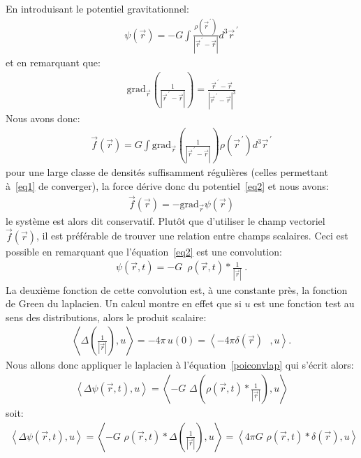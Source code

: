 En introduisant le potentiel gravitationnel:
\begin{align}
	\psi(\vec{r})=-G\displaystyle\int\frac{\rho(\vec{r}^{\,\prime})}{\left\vert \vec{r}^{\,\prime}-\vec{r}\right\vert }d^{3}\vec{r}%
	^{\,\prime}\label{eq2}%
\end{align}
et en remarquant que:
\begin{align*}
	\mathrm{grad}_{\vec{r}}\left(  \frac{1}{\left\vert \vec{r}^{\,\prime}-\vec{r}\right\vert }\right)  =\frac{\vec{r}^{\,\prime}-\vec{r}%
	}{\left\vert \vec{r}^{\,\prime}-\vec{r}\right\vert ^{3}}
\end{align*}
Nous avons donc:
\begin{align*}
	\vec{f}(\vec{r})=G\displaystyle\int\mathrm{grad}_{\vec{r}}\left(\frac{1}{\left\vert \vec{r}^{\,\prime}-\vec{r}\right\vert }\right)
	\rho(\vec{r}^{\,\prime})d^{3}\vec{r}^{\,\prime}
\end{align*}
pour une large classe de densités suffisamment régulières (celles permettant à~\ref{eq1} de converger), la force dérive donc du potentiel~\ref{eq2} et
nous avons:
\begin{align}
	\vec{f}(\vec{r})=-\mathrm{grad}_{\vec{r}}\psi(\vec{r})\label{eq3}%
\end{align}
le système est alors dit conservatif. Plutôt que d'utiliser le champ vectoriel $\vec{f}(\vec{r})$, il est préférable de trouver une relation
entre champs scalaires. Ceci est possible en remarquant que l'équation~\ref{eq2} est une convolution:
\begin{align}
	\psi(\vec{r},t)=-G\,\,\,\rho(\vec{r},t)\ast\frac{1}{\left\vert\vec{r}\right\vert }\ .\label{poiconvlap}%
\end{align}
La deuxième fonction de cette convolution est, à une constante près, la fonction de Green du laplacien. Un calcul montre en effet que si
$u$ est une fonction test au sens des distributions, alors le produit scalaire:
\begin{align*}
	\left\langle \Delta\left(  \frac{1}{\left\vert \vec{r}\right\vert }\right),u\right\rangle =-4\pi\,u\left(  0\right)  =\left\langle -4\pi\delta\left(
	\vec{r}\right)  \text{ },u\right\rangle\text{.}
\end{align*}
Nous allons donc appliquer le laplacien à l'équation~\ref{poiconvlap} qui s'écrit alors:
\begin{align*}
	\left\langle \Delta\psi(\vec{r},t),u\right\rangle =\left\langle-G\,\,\Delta\left(  \rho(\vec{r},t)\ast\frac{1}{\left\vert \vec{r}%
	\right\vert }\right),u\right\rangle
\end{align*}
soit:
\begin{align*}
	\left\langle \Delta\psi(\vec{r},t),u\right\rangle =\left\langle-G\,\,\rho(\vec{r},t)\ast\Delta\left(  \frac{1}{\left\vert \vec{r}%
	\right\vert }\right)  ,u\right\rangle =\left\langle 4\pi G\,\,\rho(\vec{r},t)\ast\delta\left(  \vec{r}\right)  ,u\right\rangle
\end{align*}

